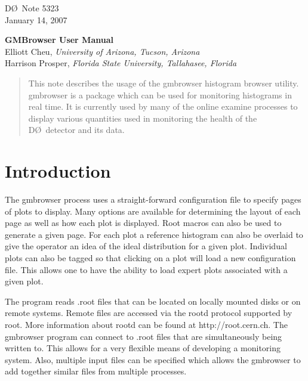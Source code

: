 \documentclass[12pt]{article}
\begin{document}
\pagestyle{plain}
\begin{flushright}D\O~Note 5323 \\
January 14, 2007
\end{flushright}
\bigskip
\begin{center}
{ \Huge \textbf{GMBrowser User Manual }}\\
\bigskip
Elliott Cheu, {\it University of Arizona, Tucson, Arizona} \\
Harrison Prosper, {\it Florida State University, Tallahasee, Florida}
\end{center}
\begin{abstract}
This note describes the usage of the gmbrowser histogram browser utility. 
gmbrowser is a package which can be used for monitoring histograms in
real time. It is currently used by many of the online examine processes
to display various quantities used in monitoring the health of the 
D\O\ detector and its data.
\end{abstract}
\vspace*{0.5cm}
\tableofcontents
\thispagestyle{empty}
\mbox{}
\clearpage
{}
\setcounter{page}{1}

\section[Introduction]{Introduction}
The gmbrowser process uses a straight-forward configuration file 
to specify pages of plots to display. Many options are available
for determining the layout of each page as well as how each plot
is displayed. Root macros can also be used to generate a given
page. For each plot a reference histogram can also be overlaid
to give the operator an idea of the ideal distribution for a given
plot. Individual plots can also be tagged so that clicking on a plot
will load a new configuration file. This allows one to have the
ability to load expert plots associated with a given plot.

The program reads .root files
that can be located on locally mounted disks or on remote systems.
Remote files are accessed via the rootd protocol supported by root.
More information about rootd can be found at http://root.cern.ch.
The gmbrowser program can connect to .root files that are simultaneously
being written to. This allows for a very flexible means of developing
a monitoring system. Also, multiple input files can be specified which
allows the gmbrowser to add together similar files from multiple
processes.
\end{document}

